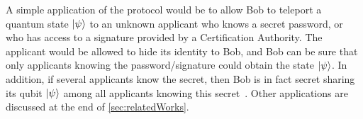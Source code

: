 A simple application of the \authBlindCanDist{} protocol would be to allow Bob to teleport a quantum state $\ket{\psi}$ to an unknown applicant who knows a secret password, or who has access to a signature provided by a Certification Authority. The applicant would be allowed to hide its identity to Bob, and Bob can be sure that only applicants knowing the password/signature could obtain the state $\ket{\psi}$. In addition, if several applicants know the secret, then Bob is in fact secret sharing its qubit $\ket{\psi}$ among all applicants knowing this secret~\cite{hillery1999quantum}. Other applications are discussed at the end of \cref{sec:relatedWorks}.



